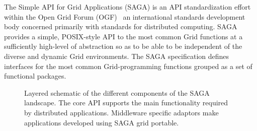 \documentclass[conference,final]{IEEEtran}
\newcommand{\up}{\vspace*{-1em}}
\begin{document}
\up

The Simple API for Grid Applications (SAGA) is an API standardization
effort within the Open Grid Forum (OGF)~\cite{ogf_web} an
international standards development body concerned primarily with
standards for distributed computing.  SAGA provides a simple,
POSIX-style API to the most common Grid functions at a sufficiently
high-level of abstraction so as to be able to be independent of the
diverse and dynamic Grid environments.  The SAGA specification defines
interfaces for the most common Grid-programming functions grouped as a
set of functional packages.  
\up
\begin{figure}[!h]
  \begin{center}
  \end{center}
  \caption{Layered schematic of the different components of the SAGA
    landscape. The core API supports the main functionality required
    by distributed applications.  Middleware specific adaptors make
    applications developed using SAGA grid portable. \up}
 \label{sagalayer}
\end{figure}

\end{document}
